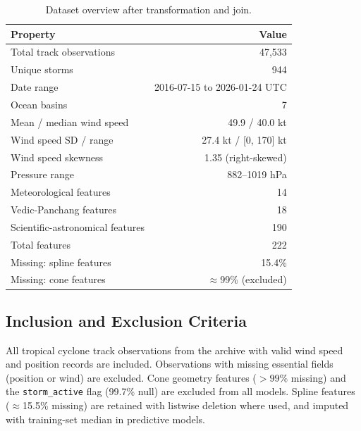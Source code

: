 \documentclass[12pt,a4paper]{article}
\begin{document}
    \begin{table}[H]
    \centering
    \caption{Dataset overview after transformation and join.}
    \label{tab:dataset}
    \begin{tabular}{lr}
        \toprule
        \textbf{Property} & \textbf{Value} \\
        \midrule
        Total track observations            & 47{,}533 \\
        Unique storms                       & 944 \\
        Date range                          & 2016-07-15 to 2026-01-24 UTC \\
        Ocean basins                        & 7 \\
        Mean / median wind speed            & 49.9 / 40.0 kt \\
        Wind speed SD / range               & 27.4 kt / [0, 170] kt \\
        Wind speed skewness                 & 1.35 (right-skewed) \\
        Pressure range                      & 882--1019 hPa \\
        Meteorological features             & 14 \\
        Vedic-Panchang features             & 18 \\
        Scientific-astronomical features    & 190 \\
        Total features                      & 222 \\
        Missing: spline features            & 15.4\% \\
        Missing: cone features              & $\approx$99\% (excluded) \\
        \bottomrule
    \end{tabular}
    \end{table}

    \subsection{Inclusion and Exclusion Criteria}

    All tropical cyclone track observations from the archive with valid wind speed
    and position records are included. Observations with missing essential fields
    (position or wind) are excluded. Cone geometry features ($>99\%$ missing) and
    the \texttt{storm\_active} flag (99.7\% null) are excluded from all models.
    Spline features ($\approx$15.5\% missing) are retained with listwise deletion
    where used, and imputed with training-set median in predictive models.
\end{document}

